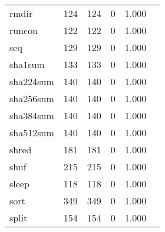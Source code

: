 \begin{longtable}{lp{2.4cm}p{2.4cm}p{2.4cm}p{2.4cm}p{2.4cm}}
rmdir     &                                    124 &                             124 &                                0 &                                       1.000 \\
runcon    &                                    122 &                             122 &                                0 &                                       1.000 \\
seq       &                                    129 &                             129 &                                0 &                                       1.000 \\
sha1sum   &                                    133 &                             133 &                                0 &                                       1.000 \\
sha224sum &                                    140 &                             140 &                                0 &                                       1.000 \\
sha256sum &                                    140 &                             140 &                                0 &                                       1.000 \\
sha384sum &                                    140 &                             140 &                                0 &                                       1.000 \\
sha512sum &                                    140 &                             140 &                                0 &                                       1.000 \\
shred     &                                    181 &                             181 &                                0 &                                       1.000 \\
shuf      &                                    215 &                             215 &                                0 &                                       1.000 \\
sleep     &                                    118 &                             118 &                                0 &                                       1.000 \\
sort      &                                    349 &                             349 &                                0 &                                       1.000 \\
split     &                                    154 &                             154 &                                0 &                                       1.000 \\

\end{longtable}
